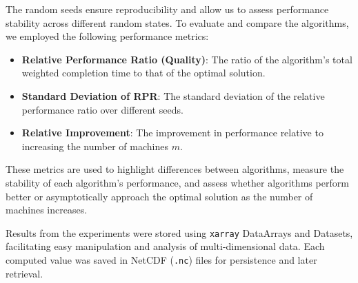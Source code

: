 The random seeds ensure reproducibility and allow us to assess performance stability across different random states. To evaluate and compare the algorithms, we employed the following performance metrics:

\begin{itemize}
    \item \textbf{Relative Performance Ratio (Quality)}: The ratio of the algorithm's total weighted completion time to that of the optimal solution.
    \item \textbf{Standard Deviation of RPR}: The standard deviation of the relative performance ratio over different seeds.
    \item \textbf{Relative Improvement}: The improvement in performance relative to increasing the number of machines $m$.
\end{itemize}

These metrics are used to highlight differences between algorithms, measure the stability of each algorithm's performance, and assess whether algorithms perform better or asymptotically approach the optimal solution as the number of machines increases.

Results from the experiments were stored using \texttt{xarray} DataArrays and Datasets, facilitating easy manipulation and analysis of multi-dimensional data. Each computed value was saved in NetCDF (\texttt{.nc}) files for persistence and later retrieval.
